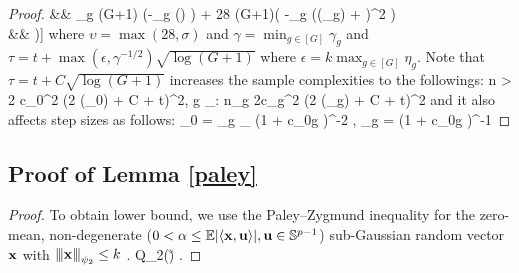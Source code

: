 \begin{proof}
	\be 
	\nr 
	&& \sigma_g (G+1) \exp\left(-\min_{g \in [G]} \left(\min{}\right) \right)
	+ 28 (G+1)\exp\left( -\gamma \min_{g \in [G]} (\omega(\cA_g) + \tau)^2  \right) 
	\\ \nr 
	&\leq& \upsilon  \exp\left[\min_{g \in [G]}\left(-\min\left[\nu_g n_g - \log G, \gamma (\omega(\cA_g) + t)^2 , \frac{t^2}{\eta_g^2 k^2}\right]\right)\right] 
	\ee	
	where $\upsilon = \max(28, \sigma)$ and $\gamma = \min_{g \in [G] } \gamma_g$ and $\tau = t + \max(\epsilon,\gamma^{-1/2}) \sqrt{\log(G+1)} $ where $\epsilon = k\max_{g \in [G]} \eta_g $. 
	Note that  $\tau = t + C\sqrt{\log (G+1)}$ increases the sample complexities to the followings:
	\be 
	\nr 
	n > 2 c_0^2 \left(2 \omega(\cA_0) + C + t\right)^2, \forall g \in [G]_\setminus: n_g \geq 2c_g^2 (2 \omega(\cA_g) + C  + t)^2
	\ee 
	and it also affects step sizes as follows:
	\be
	\nr  
	\mu_0 =  \times \min_{g \in [G]_\setminus} \left(1 + c_{0g} \right)^{-2} , \mu_g =   \left(1 + c_{0g} \right)^{-1}
	\ee 
	
	
		

\end{proof} 

\subsection{Proof of Lemma \ref{paley}}
\begin{proof}
	To obtain lower bound, we use the Paley--Zygmund inequality for the zero-mean, non-degenerate ($0 < \alpha \leq \mathbb{E} |\langle \mathbf{x}, \mathbf{u} \rangle|, \mathbf{u} \in \mathbb S^{p-1}$) sub-Gaussian random vector $\mathbf{x}$ with ${\left\vert\kern-0.25ex\left\vert\kern-0.25ex\left\vert \mathbf{x} \right\vert\kern-0.25ex\right\vert\kern-0.25ex\right\vert}_{\psi_2} \leq k$ \cite{trop15}. 
		\be 
		\nr 
		Q_{2\xi}(\u)  \geq {}.
		\ee 	
\end{proof}	

